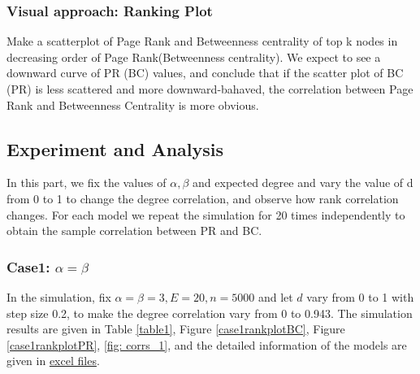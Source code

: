 \documentclass{article}
\begin{document}
\subsubsection{Visual approach: Ranking Plot}
\quad
\par Make a scatterplot of Page Rank and Betweenness centrality of top k nodes in decreasing order of Page Rank(Betweenness centrality). We expect to see a downward curve of PR (BC) values, and conclude that if the scatter plot of BC (PR)  is less scattered and more downward-bahaved, the correlation between Page Rank and Betweenness Centrality is more obvious.

\subsection{Experiment and Analysis}
\quad
\par In this part, we fix the values of $\alpha, \beta$ and expected degree and vary the value of d from 0 to 1 to change the degree correlation, and observe how rank correlation changes. For each model we repeat the simulation for 20 times independently to obtain the sample correlation between PR and BC.

\subsubsection{Case1: $\alpha=\beta$}
\quad
\par In the simulation, fix $\alpha=\beta=3, E=20, n=5000$ and let $d$ vary from 0 to 1 with step size 0.2, to make the degree correlation vary from 0 to 0.943. The simulation results are given in Table \ref{table1}, Figure \ref{case1rankplotBC}, Figure \ref{case1rankplotPR}, \ref{fig: corrs_1}, and the detailed information of the models are given in \href{https://github.com/leahwu/DCM_simulaiton_and_analysis/tree/master/output_data/part1_case1}{excel files}.
\end{document}
